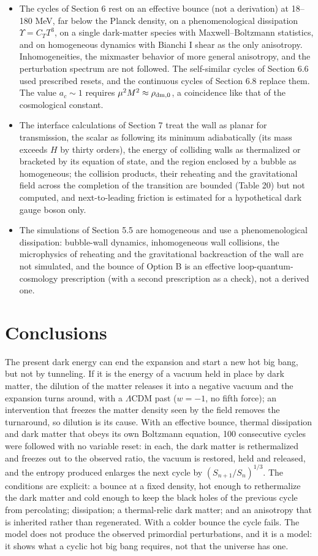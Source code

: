 \documentclass[11pt,a4paper]{article}
\begin{document}
\begin{itemize}
\item The cycles of Section 6 rest on an effective bounce (not a derivation) at 18--180 MeV, far below the Planck density, on a phenomenological dissipation $\Upsilon=C_TT^3$, on a single dark-matter species with Maxwell--Boltzmann statistics, and on homogeneous dynamics with Bianchi I shear as the only anisotropy. Inhomogeneities, the mixmaster behavior of more general anisotropy, and the perturbation spectrum are not followed. The self-similar cycles of Section 6.6 used prescribed resets, and the continuous cycles of Section 6.8 replace them. The value $a_c\sim1$ requires $\mu^2M^2\approx\rho_{\rm dm,0}$, a coincidence like that of the cosmological constant.
\item The interface calculations of Section 7 treat the wall as planar for transmission, the scalar as following its minimum adiabatically (its mass exceeds $H$ by thirty orders), the energy of colliding walls as thermalized or bracketed by its equation of state, and the region enclosed by a bubble as homogeneous; the collision products, their reheating and the gravitational field across the completion of the transition are bounded (Table 20) but not computed, and next-to-leading friction is estimated for a hypothetical dark gauge boson only.
\item The simulations of Section 5.5 are homogeneous and use a phenomenological dissipation: bubble-wall dynamics, inhomogeneous wall collisions, the microphysics of reheating and the gravitational backreaction of the wall are not simulated, and the bounce of Option B is an effective loop-quantum-cosmology prescription (with a second prescription as a check), not a derived one.
\end{itemize}
\section{Conclusions}
The present dark energy can end the expansion and start a new hot big bang, but not by tunneling. If it is the energy of a vacuum held in place by dark matter, the dilution of the matter releases it into a negative vacuum and the expansion turns around, with a $\Lambda$CDM past ($w=-1$, no fifth force); an intervention that freezes the matter density seen by the field removes the turnaround, so dilution is its cause. With an effective bounce, thermal dissipation and dark matter that obeys its own Boltzmann equation, 100 consecutive cycles were followed with no variable reset: in each, the dark matter is rethermalized and freezes out to the observed ratio, the vacuum is restored, held and released, and the entropy produced enlarges the next cycle by $(S_{n+1}/S_n)^{1/3}$. The conditions are explicit: a bounce at a fixed density, hot enough to rethermalize the dark matter and cold enough to keep the black holes of the previous cycle from percolating; dissipation; a thermal-relic dark matter; and an anisotropy that is inherited rather than regenerated. With a colder bounce the cycle fails. The model does not produce the observed primordial perturbations, and it is a model: it shows what a cyclic hot big bang requires, not that the universe has one.
\end{document}
